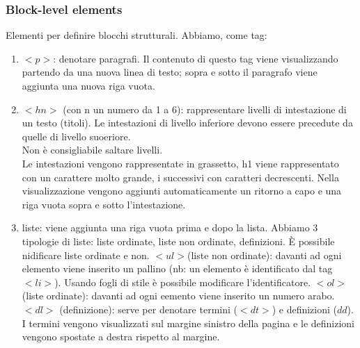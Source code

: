 \documentclass{article}
\begin{document}
\subsubsection{Block-level elements}
Elementi per definire blocchi strutturali. Abbiamo, come tag:
\begin{enumerate}
	\item $<p>$: denotare paragrafi. Il contenuto di questo tag viene visualizzando partendo da una nuova linea di testo; sopra e sotto il paragrafo viene aggiunta una nuova riga vuota.
	\item $<hn>$ (con n un numero da 1 a 6): rappresentare livelli di intestazione di un testo (titoli). Le intestazioni di livello inferiore devono essere precedute da quelle di livello suoeriore.\\
	Non è consigliabile saltare livelli.\\
	Le intestazioni vengono rappresentate in grassetto, h1 viene rappresentato con un carattere molto grande, i successivi con caratteri decrescenti. Nella visualizzazione vengono aggiunti automaticamente un ritorno a capo e una riga vuota sopra e sotto l'intestazione.
	\item liste: viene aggiunta una riga vuota prima e dopo la lista. Abbiamo 3 tipologie di liste: liste ordinate, liste non ordinate, definizioni. È possibile nidificare liste ordinate e non.
	\subitem $<ul>$(liste non ordinate): davanti  ad ogni elemento viene inserito un pallino (nb: un elemento è identificato dal tag $<li>$). Usando  fogli di stile è possibile modificare l'identificatore.
	\subitem $<ol>$ (liste ordinate): davanti ad ogni eemento viene inserito un numero arabo.
	\subitem $<dl>$ (definizione): serve per denotare termini ($<dt>$) e definizioni ($dd$). I termini vengono visualizzati sul margine sinistro della pagina e le definizioni vengono spostate a destra rispetto al margine.
\end{enumerate}
\end{document}
